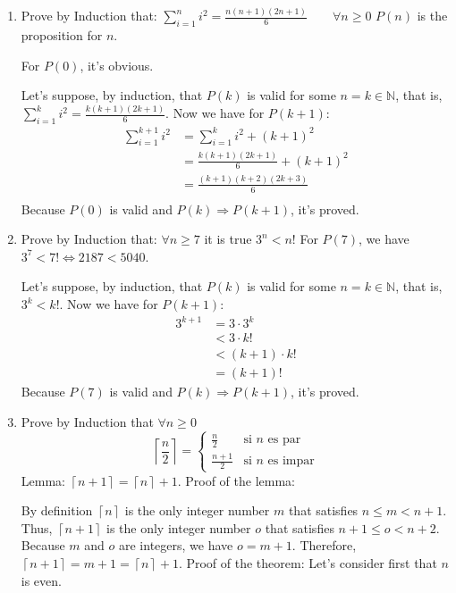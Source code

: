 \documentclass{article}
\begin{document}
\begin{enumerate}
  \item Prove by Induction that:
  \( \sum_{i=1}^{n}i^2=\frac{n(n+1)(2n+1)}{6} \qquad\forall n \geq 0\)
  \bigbreak
  $P(n)$ is the proposition for $n$.
  
  For $P(0)$, it's obvious.
  
  Let's suppose, by induction, that $P(k)$ is valid for some $n = k \in \mathbb{N}$, that is, $\sum_{i=1}^{k}i^2=\frac{k(k+1)(2k+1)}{6}$. Now we have for $P(k+1)$:
  \begin{equation*}
      \begin{aligned}
        \sum_{i=1}^{k+1}i^2 &= \sum_{i=1}^{k}i^2 + (k + 1)^2\\
        &= \frac{k(k+1)(2k+1)}{6} + (k + 1)^2\\
        &= \frac{(k+1)(k+2)(2k+3)}{6}\\
      \end{aligned}
  \end{equation*}
  Because $P(0)$ is valid and $P(k) \Rightarrow P(k+1)$, it's proved.
  \bigbreak
  \item Prove by Induction that:
  $\forall n \geq 7$ it is true $3^n<n!$
  \bigbreak
  For $P(7)$, we have $3^7 < 7! \iff 2187 < 5040$.
  
  Let's suppose, by induction, that $P(k)$ is valid for some $n = k \in \mathbb{N}$, that is, $3^k<k!$. Now we have for $P(k+1)$:
  \begin{equation*}
      \begin{aligned}
        3^{k+1} &= 3\cdot3^k\\
        &<3\cdot k!\\
        &<(k + 1)\cdot k!\\
        &=(k+1)!
      \end{aligned}
  \end{equation*}
  Because $P(7)$ is valid and $P(k) \Rightarrow P(k+1)$, it's proved.
  \bigbreak
  \item Prove by Induction that $\forall n \geq 0$
  \[
    \left \lceil\frac{n}{2} \right \rceil=
    \left\{
    \begin{array}{ll}
    \frac{n}{2}& \textrm{si $n$ es par}\\
    \frac{n+1}{2}& \textrm{si $n$ es impar}
    \end{array}
    \right.
  \]
  \bigbreak
  Lemma: $\left \lceil n + 1\right \rceil = \left \lceil n \right \rceil + 1$.
  \bigbreak
  Proof of the lemma:
  
  By definition $\left \lceil n \right \rceil$ is the only integer number $m$ that satisfies $n\leq m < n + 1$. Thus, $\left \lceil n + 1\right \rceil$ is the only integer number $o$ that satisfies $n + 1\leq o < n + 2$. Because $m$ and $o$ are integers, we have $o = m + 1$. Therefore, $\left \lceil n + 1\right \rceil = m + 1 = \left \lceil n \right \rceil + 1$.
  \bigbreak
  Proof of the theorem:
  \bigbreak
  Let's consider first that $n$ is even. 
  

\end{enumerate}
\end{document}
